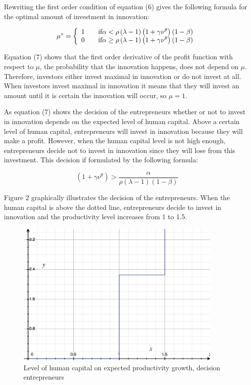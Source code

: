 \documentclass[a4paper,11pt]{article} %
\begin{document}
Rewriting the first order condition of equation (6) gives the following formula for the optimal amount of investment in innovation:

\begin{equation}
\mu^* = \left\{\begin{array}{l l}
  1 & \quad \mbox{if} \alpha<\rho \left(\lambda-1\right) \left(1+\gamma\nu^{\theta}\right) \left(1-\beta\right) \\
  0 & \quad \mbox{if} \alpha \ge \rho \left(\lambda-1\right) \left(1+\gamma\nu^{\theta}\right) \left(1-\beta\right) \\ \end{array} \right.
\end{equation}

Equation (7) shows that the first order derivative of the profit function with respect to \(\mu\), the probability that the innovation happens, does not depend on \(\mu\). Therefore, investors either invest maximal in innovation or do not invest at all. When investors invest maximal in innovation it means that they will invest an amount until it is certain the innovation will occur, so \(\mu=1\).

As equation (7) shows the decision of the entrepreneurs whether or not to invest in innovation depends on the expected level of human capital. Above a certain level of human capital, entrepreneurs will invest in innovation because they will make a profit. However, when the human capital level is not high enough, entrepreneurs decide not to invest in innovation since they will lose from this investment. This decision if formulated by the following formula:

\begin{equation}
  \left( 1+\gamma\nu^{\theta} \right) > \frac{\alpha}{\rho \left(\lambda-1\right) \left(1-\beta\right)}
\end{equation}

Figure 2 graphically illustrates the decision of the entrepreneurs. When the human capital is above the dotted line, entrepreneurs decide to invest in innovation and the productivity level increases from 1 to 1.5. 

\begin{figure}
  \centering
  \includegraphics[width=0.9\textwidth]{figure2.png}
  \caption{Level of human capital on expected productivity growth, decision entrepreneurs}
\end{figure}
\end{document}
